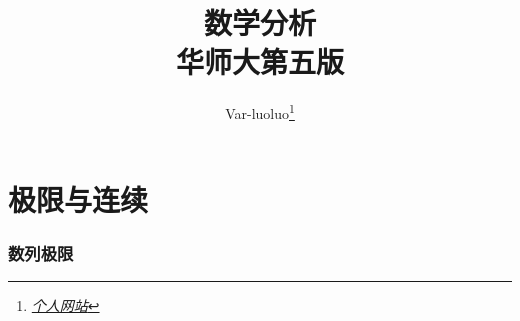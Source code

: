 \documentclass[10pt]{ctexart}
\title{{\Huge 数学分析}\\{\Large{华师大第五版}}}
\author{Var-luoluo\footnote{\href{https://var-luoluo.github.io/}{\textit{个人网站}}}}
\begin{document}
  \maketitle
  \flushbottom
  \newpage
  \pagestyle{fancynotes}
  
  \part{极限与连续}
  \lipsum[1]
  \section{数列极限}
  
\end{document}
